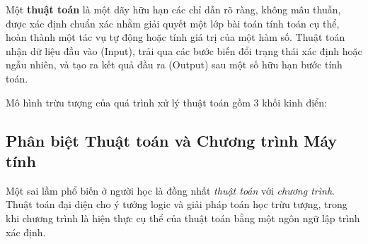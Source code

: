 \documentclass[11pt,a4paper]{article}
\begin{document}
\begin{definitionbox}
Một \textbf{thuật toán} là một dãy hữu hạn các chỉ dẫn rõ ràng, không mâu thuẫn, được xác định chuẩn xác nhằm giải quyết một lớp bài toán tính toán cụ thể, hoàn thành một tác vụ tự động hoặc tính giá trị của một hàm số. Thuật toán nhận dữ liệu đầu vào (Input), trải qua các bước biến đổi trạng thái xác định hoặc ngẫu nhiên, và tạo ra kết quả đầu ra (Output) sau một số hữu hạn bước tính toán.
\end{definitionbox}

Mô hình trừu tượng của quá trình xử lý thuật toán gồm 3 khối kinh điển:
\begin{center}
\end{center}

\subsection{Phân biệt Thuật toán và Chương trình Máy tính}
Một sai lầm phổ biến ở người học là đồng nhất \emph{thuật toán} với \emph{chương trình}. Thuật toán đại diện cho ý tưởng logic và giải pháp toán học trừu tượng, trong khi chương trình là hiện thực cụ thể của thuật toán bằng một ngôn ngữ lập trình xác định.
\end{document}
